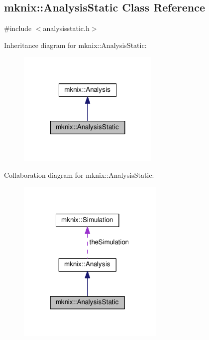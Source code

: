 \hypertarget{classmknix_1_1_analysis_static}{}\subsection{mknix\+:\+:Analysis\+Static Class Reference}
\label{classmknix_1_1_analysis_static}


{\ttfamily \#include $<$analysisstatic.\+h$>$}



Inheritance diagram for mknix\+:\+:Analysis\+Static\+:\nopagebreak
\begin{figure}[H]
\begin{center}
\leavevmode
\includegraphics[width=192pt]{dd/dc4/classmknix_1_1_analysis_static__inherit__graph}
\end{center}
\end{figure}


Collaboration diagram for mknix\+:\+:Analysis\+Static\+:\nopagebreak
\begin{figure}[H]
\begin{center}
\leavevmode
\includegraphics[width=199pt]{d2/dab/classmknix_1_1_analysis_static__coll__graph}
\end{center}
\end{figure}
